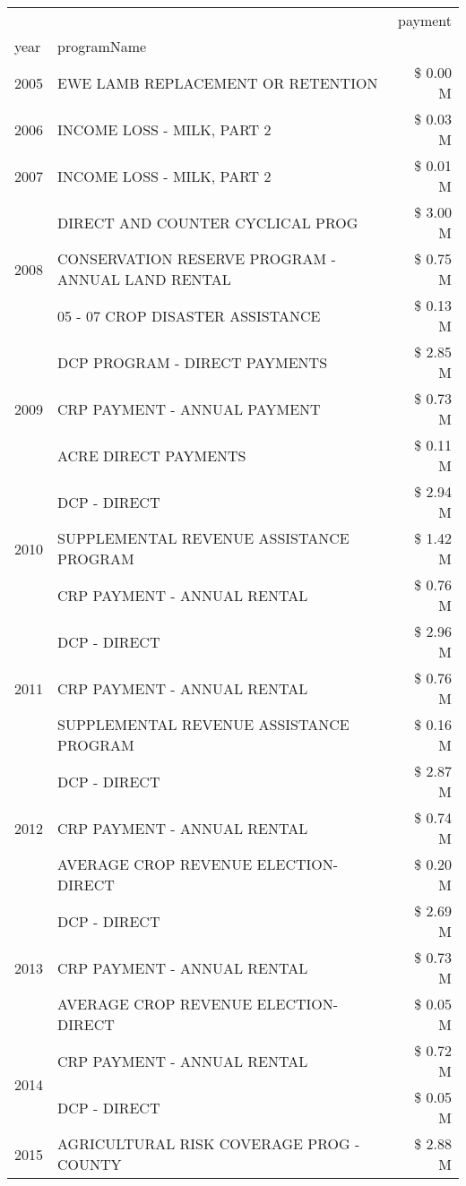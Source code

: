 \begin{tabular}{llr}
\toprule
 &  & payment \\
year & programName &  \\
\midrule
2005 & EWE LAMB REPLACEMENT OR RETENTION & \$ 0.00 M \\
\cline{1-3}
2006 & INCOME LOSS - MILK, PART 2 & \$ 0.03 M \\
\cline{1-3}
2007 & INCOME LOSS - MILK, PART 2 & \$ 0.01 M \\
\cline{1-3}
\multirow[t]{3}{*}{2008} & DIRECT AND COUNTER CYCLICAL PROG & \$ 3.00 M \\
 & CONSERVATION RESERVE PROGRAM - ANNUAL LAND RENTAL & \$ 0.75 M \\
 & 05 - 07 CROP DISASTER ASSISTANCE & \$ 0.13 M \\
\cline{1-3}
\multirow[t]{3}{*}{2009} & DCP PROGRAM - DIRECT PAYMENTS & \$ 2.85 M \\
 & CRP PAYMENT - ANNUAL PAYMENT & \$ 0.73 M \\
 & ACRE DIRECT PAYMENTS & \$ 0.11 M \\
\cline{1-3}
\multirow[t]{3}{*}{2010} & DCP - DIRECT & \$ 2.94 M \\
 & SUPPLEMENTAL REVENUE ASSISTANCE PROGRAM & \$ 1.42 M \\
 & CRP PAYMENT - ANNUAL RENTAL & \$ 0.76 M \\
\cline{1-3}
\multirow[t]{3}{*}{2011} & DCP - DIRECT & \$ 2.96 M \\
 & CRP PAYMENT - ANNUAL RENTAL & \$ 0.76 M \\
 & SUPPLEMENTAL REVENUE ASSISTANCE PROGRAM & \$ 0.16 M \\
\cline{1-3}
\multirow[t]{3}{*}{2012} & DCP - DIRECT & \$ 2.87 M \\
 & CRP PAYMENT - ANNUAL RENTAL & \$ 0.74 M \\
 & AVERAGE CROP REVENUE ELECTION-DIRECT & \$ 0.20 M \\
\cline{1-3}
\multirow[t]{3}{*}{2013} & DCP - DIRECT & \$ 2.69 M \\
 & CRP PAYMENT - ANNUAL RENTAL & \$ 0.73 M \\
 & AVERAGE CROP REVENUE ELECTION-DIRECT & \$ 0.05 M \\
\cline{1-3}
\multirow[t]{2}{*}{2014} & CRP PAYMENT - ANNUAL RENTAL & \$ 0.72 M \\
 & DCP - DIRECT & \$ 0.05 M \\
\cline{1-3}
\multirow[t]{3}{*}{2015} & AGRICULTURAL RISK COVERAGE PROG - COUNTY & \$ 2.88 M \\

\end{tabular}
